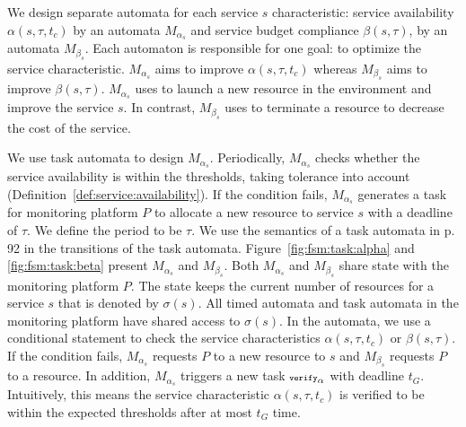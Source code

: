 We design separate automata for each service $s$ characteristic: service availability $\alpha(s,\tau,t_c)$ by an automata $M_{\alpha_s}$ and service budget compliance $\beta(s,\tau)$, by an automata $M_{\beta_s}$.
Each automaton is responsible for one goal: to optimize the service characteristic.
$M_{\alpha_s}$ aims to improve $\alpha(s,\tau,t_c)$ whereas $M_{\beta_s}$ aims to improve $\beta(s,\tau)$.
$M_{\alpha_s}$ uses  to launch a new resource in the environment and improve the service $s$.
In contrast, $M_{\beta_s}$ uses  to terminate a resource to decrease the cost of the service.

We use task automata to design $M_{\alpha_s}$.
Periodically, $M_{\alpha_s}$ checks whether the service availability
is within the thresholds, taking tolerance into account
(Definition~\ref{def:service:availability}).
If the condition fails, $M_{\alpha_s}$ generates a task for monitoring platform $P$ to allocate a new resource to service $s$ with a deadline of $\tau$.
We define the period to be $\tau$.
We use the semantics of a task automata in \cite{jaghoori2010time} p. 92 in the transitions of the task automata.
Figure~\ref{fig:fsm:task:alpha} and \ref{fig:fsm:task:beta} present $M_{\alpha_s}$ and $M_{\beta_s}$.
Both $M_{\alpha_s}$ and $M_{\beta_s}$ share state with the monitoring platform $P$.
The state keeps the current number of resources for a service $s$ that is denoted by $\sigma(s)$.
All timed automata and task automata in the monitoring platform have shared access to $\sigma(s)$.
In the automata, we use a conditional statement to check the service characteristics $\alpha(s,\tau,t_c)$ or $\beta(s,\tau)$.
If the condition fails, $M_{\alpha_s}$ requests $P$ to  a new resource to $s$ and $M_{\beta_s}$ requests $P$ to  a resource.
In addition, $M_{\alpha_s}$ triggers a new task ${\scriptsize\texttt{verify}}_\alpha$ with deadline $t_G$.
Intuitively, this means the service characteristic $\alpha(s,\tau,t_c)$ is verified to be within the expected thresholds after at most $t_G$ time.

